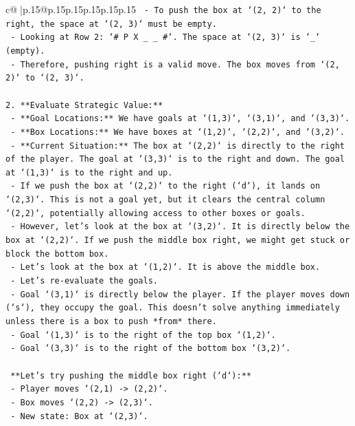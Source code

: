 \documentclass{article}
\begin{document}
{\begin{supertabular}{c@{$\;$}|p{.15\linewidth}@{}p{.15\linewidth}p{.15\linewidth}p{.15\linewidth}p{.15\linewidth}p{.15\linewidth}}
{{{\texttt{        {-} To push the box at `(2, 2)` to the right, the space at `(2, 3)` must be empty.} \\
\texttt{        {-} Looking at Row 2: `\# P X \_ \_ \#`. The space at `(2, 3)` is `\_` (empty).} \\
\texttt{        {-} Therefore, pushing right is a valid move. The box moves from `(2, 2)` to `(2, 3)`.} \\
\\ 
\texttt{2.  **Evaluate Strategic Value:**} \\
\texttt{    {-} **Goal Locations:** We have goals at `(1,3)`, `(3,1)`, and `(3,3)`.} \\
\texttt{    {-} **Box Locations:** We have boxes at `(1,2)`, `(2,2)`, and `(3,2)`.} \\
\texttt{    {-} **Current Situation:** The box at `(2,2)` is directly to the right of the player. The goal at `(3,3)` is to the right and down. The goal at `(1,3)` is to the right and up.} \\
\texttt{    {-} If we push the box at `(2,2)` to the right (`d`), it lands on `(2,3)`. This is not a goal yet, but it clears the central column `(2,2)`, potentially allowing access to other boxes or goals.} \\
\texttt{    {-} However, let's look at the box at `(3,2)`. It is directly below the box at `(2,2)`. If we push the middle box right, we might get stuck or block the bottom box.} \\
\texttt{    {-} Let's look at the box at `(1,2)`. It is above the middle box.} \\
\texttt{    {-} Let's re{-}evaluate the goals.} \\
\texttt{        {-} Goal `(3,1)` is directly below the player. If the player moves down (`s`), they occupy the goal. This doesn't solve anything immediately unless there is a box to push *from* there.} \\
\texttt{        {-} Goal `(1,3)` is to the right of the top box `(1,2)`.} \\
\texttt{        {-} Goal `(3,3)` is to the right of the bottom box `(3,2)`.} \\
\\ 
\texttt{    **Let's try pushing the middle box right (`d`):**} \\
\texttt{    {-} Player moves `(2,1) {-}> (2,2)`.} \\
\texttt{    {-} Box moves `(2,2) {-}> (2,3)`.} \\
\texttt{    {-} New state: Box at `(2,3)`.} \\
}}}
\end{supertabular}}
\end{document}
